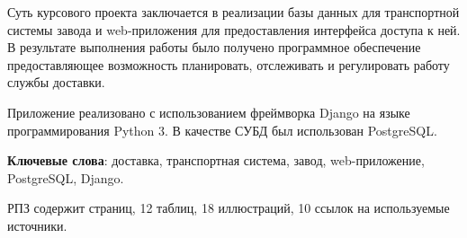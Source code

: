 Суть курсового проекта заключается в реализации базы данных для транспортной системы завода и web-приложения для предоставления интерфейса доступа к ней. В результате выполнения работы было получено программное обеспечение предоставляющее возможность планировать, отслеживать и регулировать работу службы доставки.

Приложение реализовано с использованием фреймворка Django на языке программирования Python 3. В качестве СУБД был использован PostgreSQL.

\textbf{Ключевые слова}: доставка, транспортная система, завод, web-приложение, PostgreSQL, Django.

РПЗ содержит \pageref{lastpage} страниц, 
12 таблиц,
18 иллюстраций,
10 ссылок на используемые источники.